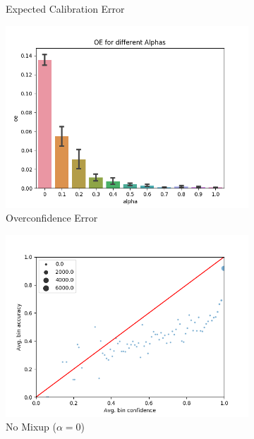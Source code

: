 \begin{figure}[h]
\begin{subfigure}[b]{0.31\textwidth}
         \caption{Expected Calibration Error}
     \end{subfigure}
     \begin{subfigure}[b]{0.31\textwidth}
         \centering
         \includegraphics[width=\textwidth]{images/stl10/oeValpha.png}
         \caption{Overconfidence Error}
     \end{subfigure}
     \begin{subfigure}[b]{0.31\textwidth}
         \centering
         \noindent\includegraphics[width=\textwidth]{images/stl10/scatterplot_0.png}
         \caption{No Mixup ($\alpha=0$)}
     \end{subfigure}
     \begin{subfigure}[b]{0.31\textwidth}

\end{subfigure}
\end{figure}
